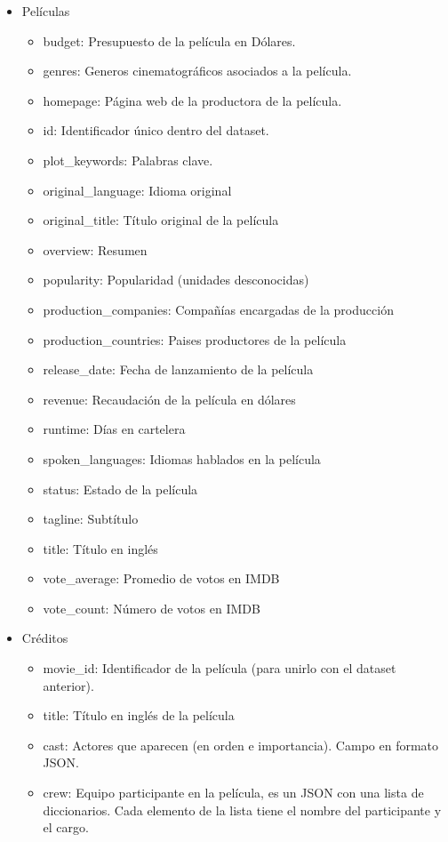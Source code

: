 \begin{itemize}
    \item Películas
    \begin{itemize}
        \item budget: Presupuesto de la película en Dólares.
        \item genres: Generos cinematográficos asociados a la película.
        \item homepage: Página web de la productora de la película.
        \item id: Identificador único dentro del dataset.
        \item plot\_keywords: Palabras clave.
        \item original\_language: Idioma original
        \item original\_title: Título original de la película
        \item overview: Resumen
        \item popularity: Popularidad (unidades desconocidas)
        \item production\_companies: Compañías encargadas de la producción
        \item production\_countries: Paises productores de la película
        \item release\_date: Fecha de lanzamiento de la película
        \item revenue: Recaudación de la película en dólares
        \item runtime: Días en cartelera
        \item spoken\_languages: Idiomas hablados en la película
        \item status: Estado de la película
        \item tagline: Subtítulo
        \item title: Título en inglés
        \item vote\_average: Promedio de votos en IMDB
        \item vote\_count: Número de votos en IMDB
    \end{itemize}
    \item Créditos
    \begin{itemize}
        \item movie\_id: Identificador de la película (para unirlo con el dataset anterior).
        \item title: Título en inglés de la película
        \item cast: Actores que aparecen (en orden e importancia). Campo en formato JSON.
        \item crew: Equipo participante en la película, es un JSON con una lista de diccionarios. Cada elemento de la lista tiene el nombre del participante y el cargo.
    \end{itemize}
\end{itemize}

